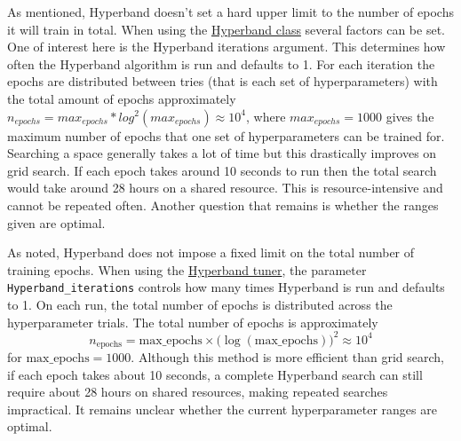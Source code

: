 As mentioned, Hyperband doesn't set a hard upper limit to the number of epochs it will train in total. When using the \href{https://keras.io/api/keras_tuner/tuners/hyperband/}{Hyperband class} several factors can be set. One of interest here is the Hyperband iterations argument. This determines how often the Hyperband algorithm is run and defaults to 1. For each iteration the epochs are distributed between tries (that is each set of hyperparameters) with the total amount of epochs approximately $n_{epochs} = max_{epochs} * log^2(max_{epochs})\approx 10^4$, where $max_{epochs} = 1000$ gives the maximum number of epochs that one set of hyperparameters can be trained for. Searching a space generally takes a lot of time but this drastically improves on grid search. If each epoch takes around 10 seconds to run then the total search would take around 28 hours on a shared resource. This is resource-intensive and cannot be repeated often. Another question that remains is whether the ranges given are optimal.

As noted, Hyperband does not impose a fixed limit on the total number of training epochs. When using the \href{https://keras.io/api/keras_tuner/tuners/hyperband/}{Hyperband tuner}, the parameter \texttt{Hyperband\_iterations} controls how many times Hyperband is run and defaults to 1. On each run, the total number of epochs is distributed across the hyperparameter trials. The total number of epochs is approximately
%
\begin{equation*}
n_{\mathrm{epochs}} = \text{max\_epochs} \times \bigl(\log(\text{max\_epochs})\bigr)^2 \approx 10^4
\end{equation*}
%
for $ \text{max\_epochs} = 1000$. Although this method is more efficient than grid search, if each epoch takes about 10 seconds, a complete Hyperband search can still require about 28 hours on shared resources, making repeated searches impractical. It remains unclear whether the current hyperparameter ranges are optimal.